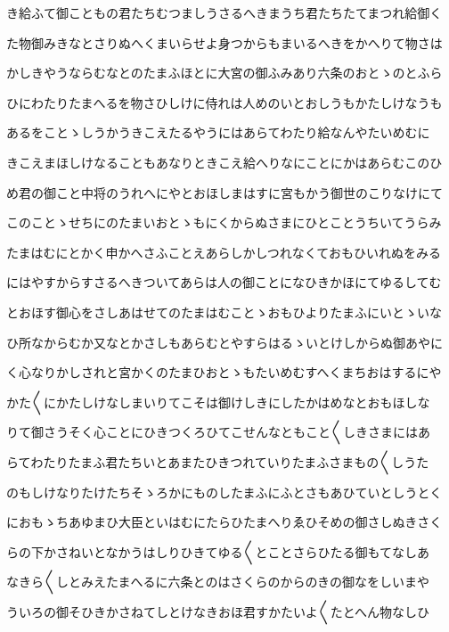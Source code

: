 \documentclass[a4paper,11pt,landscape]{ltjtarticle}
\begin{document}
\par\medskip
き給ふて御こともの君たちむつましうさるへきまうち君たちたてまつれ給御く
\par\medskip
た物御みきなとさりぬへくまいらせよ身つからもまいるへきをかへりて物さは
\par\medskip
かしきやうならむなとのたまふほとに大宮の御ふみあり六条のおとゝのとふら
\par\medskip
ひにわたりたまへるを物さひしけに侍れは人めのいとおしうもかたしけなうも
\par\medskip
あるをことゝしうかうきこえたるやうにはあらてわたり給なんやたいめむに
\par\medskip
きこえまほしけなることもあなりときこえ給へりなにことにかはあらむこのひ
\par\medskip
め君の御こと中将のうれへにやとおほしまはすに宮もかう御世のこりなけにて
\par\medskip
このことゝせちにのたまいおとゝもにくからぬさまにひとことうちいてうらみ
\par\medskip
たまはむにとかく申かへさふことえあらしかしつれなくておもひいれぬをみる
\par\medskip
にはやすからすさるへきついてあらは人の御ことになひきかほにてゆるしてむ
\par\medskip
とおほす御心をさしあはせてのたまはむことゝおもひよりたまふにいとゝいな
\par\medskip
ひ所なからむか又なとかさしもあらむとやすらはるゝいとけしからぬ御あやに
\par\medskip
く心なりかしされと宮かくのたまひおとゝもたいめむすへくまちおはするにや
\par\medskip
かた〱にかたしけなしまいりてこそは御けしきにしたかはめなとおもほしな
\par\medskip
りて御さうそく心ことにひきつくろひてこせんなともこと〱しきさまにはあ
\par\medskip
らてわたりたまふ君たちいとあまたひきつれていりたまふさまもの〱しうた
\par\medskip
のもしけなりたけたちそゝろかにものしたまふにふとさもあひていとしうとく
\par\medskip
におもゝちあゆまひ大臣といはむにたらひたまへりゑひそめの御さしぬきさく
\par\medskip
らの下かさねいとなかうはしりひきてゆる〱とことさらひたる御もてなしあ
\par\medskip
なきら〱しとみえたまへるに六条とのはさくらのからのきの御なをしいまや
\par\medskip
ういろの御そひきかさねてしとけなきおほ君すかたいよ〱たとへん物なしひ
\par\medskip
\end{document}
